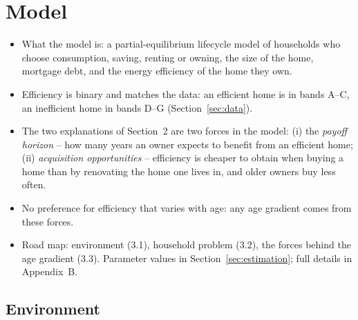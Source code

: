 %
\section{Model}\label{sec:model}

\begin{itemize}
  \item What the model is: a partial-equilibrium lifecycle model of
    households who choose consumption, saving, renting or owning, the size
    of the home, mortgage debt, and the energy efficiency of the home they
    own.
  \item Efficiency is binary and matches the data: an efficient home is in
    bands A--C, an inefficient home in bands D--G (Section~\ref{sec:data}).
  \item The two explanations of Section~2 are two forces in the model:
    (i) the \emph{payoff horizon} -- how many years an owner expects to
    benefit from an efficient home; (ii) \emph{acquisition opportunities}
    -- efficiency is cheaper to obtain when buying a home than by renovating
    the home one lives in, and older owners buy less often.
  \item No preference for efficiency that varies with age: any age gradient
    comes from these forces.
  \item Road map: environment (3.1), household problem (3.2), the forces
    behind the age gradient (3.3). Parameter values in
    Section~\ref{sec:estimation}; full details in Appendix~B.
\end{itemize}

\subsection{Environment}

